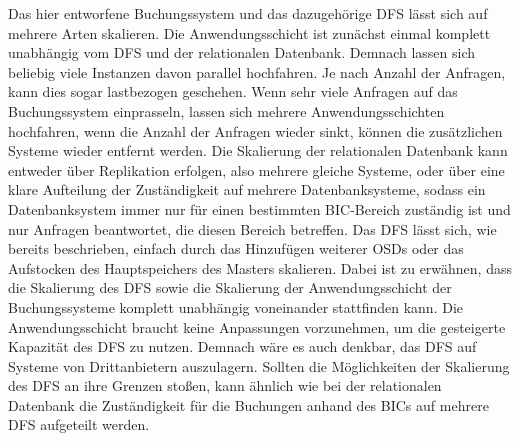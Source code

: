 \documentclass[12pt,oneside,a4paper,parskip]{scrbook}
\begin{document}
Das hier entworfene Buchungssystem und das dazugehörige DFS lässt sich auf mehrere Arten skalieren. Die Anwendungsschicht ist zunächst einmal komplett unabhängig vom DFS und der relationalen Datenbank. Demnach lassen sich beliebig viele Instanzen davon parallel hochfahren. Je nach Anzahl der Anfragen, kann dies sogar lastbezogen geschehen. Wenn sehr viele Anfragen auf das Buchungssystem einprasseln, lassen sich mehrere Anwendungsschichten hochfahren, wenn die Anzahl der Anfragen wieder sinkt, können die zusätzlichen Systeme wieder entfernt werden. Die Skalierung der relationalen Datenbank kann entweder über Replikation erfolgen, also mehrere gleiche Systeme, oder über eine klare Aufteilung der Zuständigkeit auf mehrere Datenbanksysteme, sodass ein Datenbanksystem immer nur für einen bestimmten BIC-Bereich zuständig ist und nur Anfragen beantwortet, die diesen Bereich betreffen. Das DFS lässt sich, wie bereits beschrieben, einfach durch das Hinzufügen weiterer OSDs oder das Aufstocken des Hauptspeichers des Masters skalieren. Dabei ist zu erwähnen, dass die Skalierung des DFS sowie die Skalierung der Anwendungsschicht der Buchungssysteme komplett unabhängig voneinander stattfinden kann. Die Anwendungsschicht braucht keine Anpassungen vorzunehmen, um die gesteigerte Kapazität des DFS zu nutzen. Demnach wäre es auch denkbar, das DFS auf Systeme von Drittanbietern auszulagern. Sollten die Möglichkeiten der Skalierung des DFS an ihre Grenzen stoßen, kann ähnlich wie bei der relationalen Datenbank die Zuständigkeit für die Buchungen anhand des BICs auf mehrere DFS aufgeteilt werden.

\cleardoublepage
\end{document}
